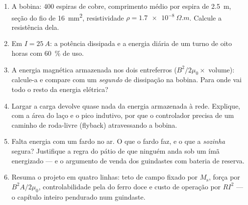 \begin{problem}
\begin{enumerate}[resume]
  \item A bobina: 400 espiras de cobre, comprimento médio por espira de
        \qty{2.5}{m}, seção do fio de \qty{16}{mm^2}, resistividade
        $\rho = \qty{1.7e-8}{\Omega.m}$. Calcule a resistência dela.
  \item Em $I = \qty{25}{A}$: a potência dissipada e a energia
        diária de um turno de oito horas com \qty{60}{\percent} de uso.
  \item A energia magnética armazenada nos dois entreferros
        ($B^2/2\mu_0 \times$ volume): calcule-a e compare com
        um \emph{segundo} de dissipação na bobina. Para onde vai todo
        o resto da energia elétrica?
  \item Largar a carga devolve quase nada da energia armazenada
        à rede. Explique, com a área do laço e o pico
        indutivo, por que o controlador precisa de um caminho de roda-livre
        (flyback) atravessando a bobina.
  \item Falta energia com um fardo no ar. O que o fardo
        faz, e o que a  \emph{sozinha} segura? Justifique
        a regra do pátio de que ninguém anda sob um ímã energizado ---
        e o argumento de venda dos guindastes com bateria de reserva.
  \item Resuma o projeto em quatro linhas: teto de campo fixado por
        $M_{\text{s}}$, força por $B^2A/2\mu_0$, controlabilidade pela
         do ferro doce e custo de operação por $RI^2$ --- o
        capítulo inteiro pendurado num guindaste.
\end{enumerate}
\end{problem}
